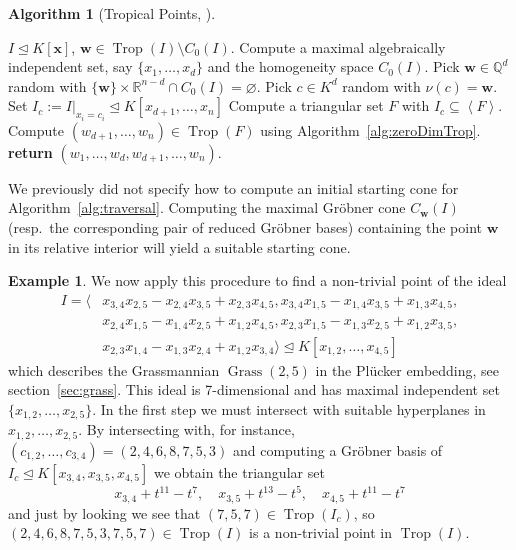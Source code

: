 \documentclass[
  paper=a4,
  titlepage,
  bibliography=totoc,
  pagesize=pdftex
]{scrartcl}
\numberwithin{figure}{section}
\numberwithin{equation}{section}
\numberwithin{table}{section}
\newcommand*\setR{\mathds{R}}
\newcommand*\setQ{\mathds{Q}}
\newcommand*\setT{\mathds{T}}
\newcommand*\ideal[1]{\left\langle #1 \right\rangle}
\let\vec\mathbf
\let\idealof\trianglelefteq
\DeclareMathOperator{\Trop}{Trop}
\DeclareMathOperator{\Grass}{Grass}
\theoremstyle{definition}
\newtheorem{example}[definition]{Example}
\newtheorem{algo}[definition]{Algorithm}
\numberwithin{definition}{section}
\begin{document}
\begin{algo}[Tropical Points, {\cite[Algorithm~3.3]{tropPointsLinks}}]\
  \begin{algorithmic}[1]
    \Require $I \idealof K[\vec x]$,
    \Ensure $\vec w \in \Trop(I) \setminus C_0(I)$.
    \State Compute a maximal algebraically independent set, say $\{x_1, \dots, x_d\}$ and
    the homogeneity space $C_0(I)$.
    \Repeat
      \State Pick $\vec w \in \setQ^d$ random with $\{\vec w\} \times \setR^{n-d} \cap
        C_0(I) = \varnothing$.
      \State Pick $c \in K^d$ random with $\nu(c) = \vec w$.
      \State Set $I_c := I|_{x_i = c_i} \idealof K[x_{d+1}, \dots, x_n]$
    \Until{$\dim(I_c) = 0$ and $V(I_c) \subseteq \setT^{n-d}$}
    \State Compute a triangular set $F$ with $I_c \subseteq \ideal F$.
    \State Compute $(w_{d+1}, \dots, w_n) \in \Trop(F)$ using
      Algorithm~\ref{alg:zeroDimTrop}.
    \State\textbf{return} $(w_1, \dots, w_d, w_{d+1}, \dots, w_n)$.
  \end{algorithmic}
  \label{alg:tropicalPoint}
\end{algo}

We previously did not specify how to compute an initial starting cone for
Algorithm~\ref{alg:traversal}. Computing the maximal Gröbner cone $C_{\vec w}(I)$ (resp.\
the corresponding pair of reduced Gröbner bases) containing the point $\vec w$ in its
relative interior will yield a suitable starting cone.

\begin{example}
  \label{ex:pointG25}
  We now apply this procedure to find a non-trivial point of the ideal
  \begin{align*}
    I = \bigl\langle
      & x_{3,4}x_{2,5}-x_{2,4}x_{3,5}+x_{2,3}x_{4,5},
        x_{3,4}x_{1,5}-x_{1,4}x_{3,5}+x_{1,3}x_{4,5}, \\
      & x_{2,4}x_{1,5}-x_{1,4}x_{2,5}+x_{1,2}x_{4,5},
        x_{2,3}x_{1,5}-x_{1,3}x_{2,5}+x_{1,2}x_{3,5}, \\
      & x_{2,3}x_{1,4}-x_{1,3}x_{2,4}+x_{1,2}x_{3,4}
    \bigr\rangle \idealof K[x_{1,2}, \dots, x_{4,5}]
  \end{align*}
  which describes the Grassmannian $\Grass(2,5)$ in the Plücker embedding, see
  section~\ref{sec:grass}. This ideal is 7-dimensional and has maximal independent set
  $\{x_{1,2}, \dots, x_{2,5} \}$. In the first step we must intersect with suitable
  hyperplanes in $x_{1, 2}, \dots, x_{2,5}$. By intersecting with, for instance,
  $(c_{1,2}, \dots, c_{3,4}) = (2,4,6,8,7,5,3)$ and computing a Gröbner basis of $I_c
  \idealof K[x_{3,4},x_{3,5},x_{4,5}]$ we obtain the triangular set
  \[
    x_{3,4} + t^{11} - t^{7},\quad
    x_{3,5} + t^{13} - t^{5},\quad
    x_{4,5} + t^{11} - t^{7}
  \]
  and just by looking we see that $(7,5,7) \in \Trop(I_c)$, so $(2,4,6,8,7,5,3,7,5,7) \in
  \Trop(I)$ is a non-trivial point in $\Trop(I)$.
\end{example}
\end{document}
